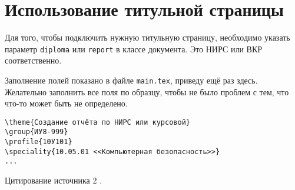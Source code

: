 \section{Использование титульной страницы}

Для того, чтобы подключить нужную титульную страницу, необходимо 
указать параметр \texttt{diploma} или \texttt{report} в классе документа. 
Это НИРС или ВКР соответственно. 

Заполнение полей показано в файле \texttt{main.tex}, приведу ещё раз здесь. 
Желательно заполнить все поля по образцу, чтобы не было проблем с тем, 
что что-то может быть не определено.

\begin{verbatim}
\theme{Создание отчёта по НИРС или курсовой}
\group{ИУ8-999}
\profile{10У101}
\speciality{10.05.01 <<Компьютерная безопасность>>}
...
\end{verbatim}

\lipsum[1-5]

Цитирование источника 2 \cite{Wikipedia2}.